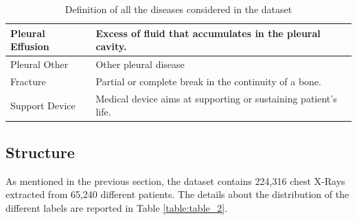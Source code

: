 \begin{table}[h!]
\begin{tabularx}{\textwidth}{|l|X|}
\hline
Pleural Effusion           & Excess of fluid that accumulates in the pleural cavity.                                                                                                     \\ 
\hline
Pleural Other              & Other pleural disease                                                                                                      \\ 
\hline
Fracture                   & Partial or complete break in the continuity of a bone.                                                                                                      \\ 
\hline
Support Device             & Medical device aims at supporting or sustaining patient's life.                                                                                                      \\
\hline
\end{tabularx}
\caption{Definition of all the diseases considered in the dataset}
\label{table:table_1}
\end{table}



\subsection{Structure}
\label{sec:dataset_structure}
As mentioned in the previous section, the dataset contains 224,316 chest X-Rays extracted from 65,240 different patients. The details about the distribution of the different labels are reported in Table \ref{table:table_2}.


